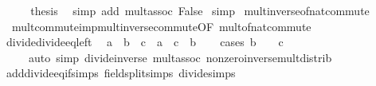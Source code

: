 \begin{isabellebody}
\ \ \isamarkupfalse%
\ \isamarkupfalse%
\ {\isacharquery}{\kern0pt}thesis\ \isamarkupfalse%
\ {\isacharparenleft}{\kern0pt}simp\ add{\isacharcolon}{\kern0pt}\ mult{\isachardot}{\kern0pt}assoc\ False{\isacharparenright}{\kern0pt}\isanewline
{}\isamarkupfalse%
\ simp%
\endisatagproof
{\isafoldproof}%
%
\isadelimproof
\isanewline
%
\endisadelimproof
\isanewline
{}\isamarkupfalse%
\ mult{\isacharunderscore}{\kern0pt}inverse{\isacharunderscore}{\kern0pt}of{\isacharunderscore}{\kern0pt}nat{\isacharunderscore}{\kern0pt}commute\ {\isacharequal}{\kern0pt}\isanewline
\ \ mult{\isacharunderscore}{\kern0pt}commute{\isacharunderscore}{\kern0pt}imp{\isacharunderscore}{\kern0pt}mult{\isacharunderscore}{\kern0pt}inverse{\isacharunderscore}{\kern0pt}commute{\isacharbrackleft}{\kern0pt}OF\ mult{\isacharunderscore}{\kern0pt}of{\isacharunderscore}{\kern0pt}nat{\isacharunderscore}{\kern0pt}commute{\isacharbrackright}{\kern0pt}\isanewline
\isanewline
{}\isamarkupfalse%
\ divide{\isacharunderscore}{\kern0pt}divide{\isacharunderscore}{\kern0pt}eq{\isacharunderscore}{\kern0pt}left{\isacharprime}{\kern0pt}{\isacharcolon}{\kern0pt}\isanewline
\ \ {\isachardoublequoteopen}{\isacharparenleft}{\kern0pt}a\ {\isacharslash}{\kern0pt}\ b{\isacharparenright}{\kern0pt}\ {\isacharslash}{\kern0pt}\ c\ {\isacharequal}{\kern0pt}\ a\ {\isacharslash}{\kern0pt}\ {\isacharparenleft}{\kern0pt}c\ {\isacharasterisk}{\kern0pt}\ b{\isacharparenright}{\kern0pt}{\isachardoublequoteclose}\isanewline
%
\isadelimproof
\ \ %
\endisadelimproof
%
\isatagproof
{}\isamarkupfalse%
\ {\isacharparenleft}{\kern0pt}cases\ {\isachardoublequoteopen}b\ {\isacharequal}{\kern0pt}\ {}\ {\isasymor}\ c\ {\isacharequal}{\kern0pt}\ {}{\isachardoublequoteclose}{\isacharparenright}{\kern0pt}\isanewline
\ \ \ \ \ {\isacharparenleft}{\kern0pt}auto\ simp{\isacharcolon}{\kern0pt}\ divide{\isacharunderscore}{\kern0pt}inverse\ mult{\isachardot}{\kern0pt}assoc\ nonzero{\isacharunderscore}{\kern0pt}inverse{\isacharunderscore}{\kern0pt}mult{\isacharunderscore}{\kern0pt}distrib{\isacharparenright}{\kern0pt}%
\endisatagproof
{\isafoldproof}%
%
\isadelimproof
\isanewline
%
\endisadelimproof
\isanewline
{}\isamarkupfalse%
\ add{\isacharunderscore}{\kern0pt}divide{\isacharunderscore}{\kern0pt}eq{\isacharunderscore}{\kern0pt}if{\isacharunderscore}{\kern0pt}simps\ {\isacharbrackleft}{\kern0pt}field{\isacharunderscore}{\kern0pt}split{\isacharunderscore}{\kern0pt}simps{\isacharcomma}{\kern0pt}\ divide{\isacharunderscore}{\kern0pt}simps{\isacharbrackright}{\kern0pt}{\isacharcolon}{\kern0pt}\isanewline

\end{isabellebody}
